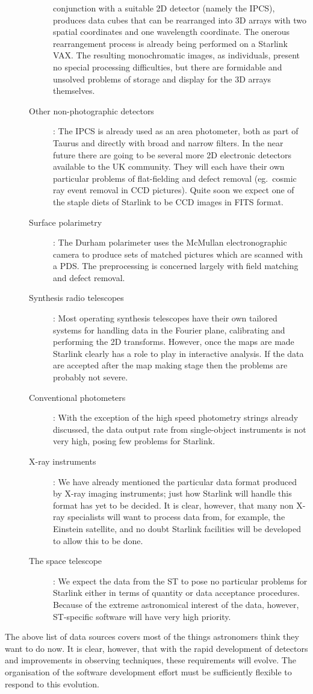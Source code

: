 \begin{description}
\begin{description}
conjunction with a suitable 2D detector (namely the IPCS), produces data cubes
that can be rearranged into 3D arrays with two spatial coordinates and one
wavelength coordinate.
The onerous rearrangement process is already being performed on a Starlink VAX.
The resulting monochromatic images, as individuals, present no special
processing difficulties, but there are formidable and unsolved problems of
storage and display for the 3D arrays themselves.
\item [Other non-photographic detectors]: The IPCS is already used as an area
photometer, both as part of Taurus and directly with broad and narrow filters.
In the near future there are going to be several more 2D electronic detectors
available to the UK community.
They will each have their own particular problems of flat-fielding and defect
removal (eg.\ cosmic ray event removal in CCD pictures).
Quite soon we expect one of the staple diets of Starlink to be CCD images in
FITS format.
\item [Surface polarimetry]: The Durham polarimeter uses the McMullan
electronographic camera to produce sets of matched pictures which are scanned
with a PDS.
The preprocessing is concerned largely with field matching and defect removal.
\item [Synthesis radio telescopes]: Most operating synthesis telescopes have
their own tailored systems for handling data in the Fourier plane, calibrating
and performing the 2D transforms.
However, once the maps are made Starlink clearly has a role to play in
interactive analysis.
If the data are accepted after the map making stage then the problems are
probably not severe.
\item [Conventional photometers]: With the exception of the high speed
photometry strings already discussed, the data output rate from single-object
instruments is not very high, posing few problems for Starlink.
\item [X-ray instruments]: We have already mentioned the particular data format
produced by X-ray imaging instruments; just how Starlink will handle this format
has yet to be decided.
It is clear, however, that many non X-ray specialists will want to process data
from, for example, the Einstein satellite, and no doubt Starlink facilities will
be developed to allow this to be done.
\item [The space telescope]: We expect the data from the ST to pose no
particular problems for Starlink either in terms of quantity or data acceptance
procedures.
Because of the extreme astronomical interest of the data, however, ST-specific
software will have very high priority.
\end{description}
\end{description}
The above list of data sources covers most of the things astronomers think they
want to do now.
It is clear, however, that with the rapid development of detectors and
improvements in observing techniques, these requirements will evolve.
The organisation of the software development effort must be sufficiently
flexible to respond to this evolution.
